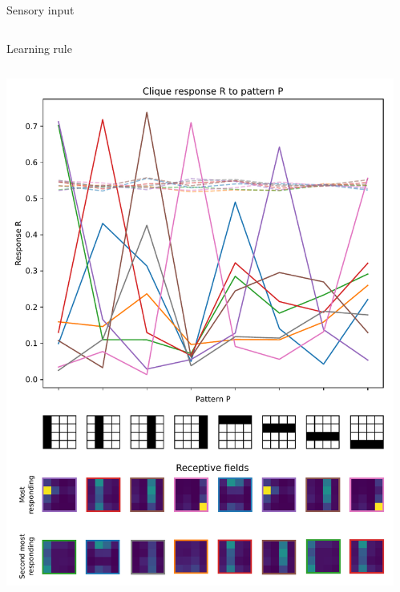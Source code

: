\documentclass[final,hyperref={pdfpagelabels=false}]{beamer}
\begin{document}
\begin{frame}
\begin{columns}
\begin{column}{.64\textwidth}
\begin{minipage}[T]{.95\textwidth}
{\begin{block}{Sensory input}
\begin{columns}
\begin{column}[T]{.9\textwidth}
							\end{column}
						\end{columns}

							

					\end{block}
						
					\begin{block}{Learning rule}
						\begin{columns}
							\begin{column}[T]{.5\textwidth}
								\includegraphics[width=1\linewidth]{complete2.pdf}	
							\end{column}								
							
							\begin{column}[T]{.5\textwidth}
								
							\end{column}
						\end{columns}
							
										
					\end{block}
						

}
\end{minipage}
\end{column}
\end{columns}
\end{frame}
\end{document}
